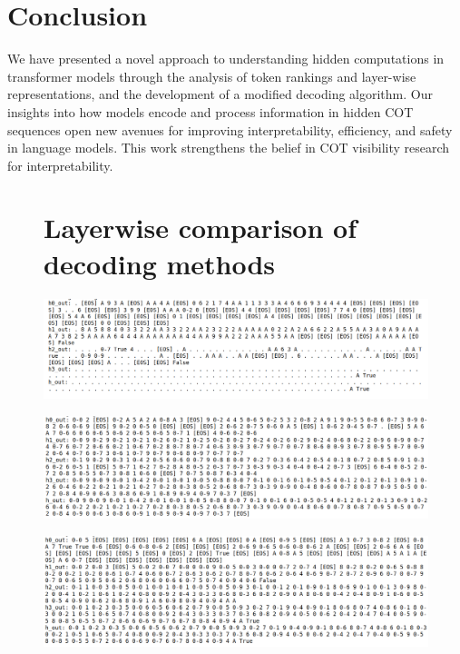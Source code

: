 \documentclass[10pt,a4paper]{article}
\begin{document}
\clearpage
\section{Conclusion}
We have presented a novel approach to understanding hidden computations in transformer models through the analysis of token rankings and layer-wise representations, and the development of a modified decoding algorithm. Our insights into how models encode and process information in hidden COT sequences open new avenues for improving interpretability, efficiency, and safety in language models. This work strengthens the belief in COT visibility research for interpretability\cite{2}.

\appendix
\begin{figure}[p]
    \centering
    \section{Layerwise comparison of decoding methods}
    \vspace{-0.5em}  %
    
    \includegraphics[width=\textwidth,height=0.19\textheight,keepaspectratio]{greedy_decoding.png}
    \label{fig:greedy}
    
    \vspace{0.5em}
    
    \includegraphics[width=\textwidth,height=0.19\textheight,keepaspectratio]{rank2_decoding.png}
    \label{fig:rank2}
    
    \vspace{0.5em}
    
    \includegraphics[width=\textwidth,height=0.19\textheight,keepaspectratio]{our_method_decoding.png}
    \label{fig:our-method}
    

\end{figure}
\end{document}
